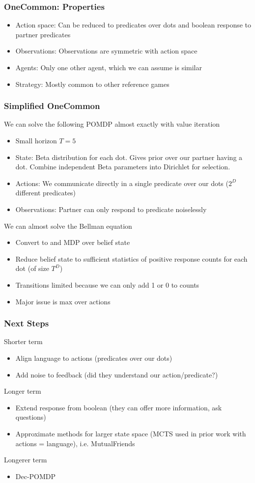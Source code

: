 \documentclass{beamer}
\begin{document}
\begin{frame}
\frametitle{OneCommon: Properties}
\begin{itemize}
\item Action space: Can be reduced to predicates over dots and boolean response
    to partner predicates
\item Observations: Observations are symmetric with action space
\item Agents: Only one other agent, which we can assume is similar
\item Strategy: Mostly common to other reference games
\end{itemize}
\end{frame}

\begin{frame}
\frametitle{Simplified OneCommon}
We can solve the following POMDP almost exactly with value iteration
\begin{itemize}
\item Small horizon $T=5$
\item State: Beta distribution for each dot.
    Gives prior over our partner having a dot.
    Combine independent Beta parameters into Dirichlet for selection.
\item Actions: We communicate directly in a single predicate over our dots
    ($2^{D}$ different predicates)
\item Observations: Partner can only respond to predicate noiselessly
\end{itemize}
We can almost solve the Bellman equation
\begin{itemize}
\item Convert to and MDP over belief state
\item Reduce belief state to sufficient statistics of positive response counts for each dot
    (of size $T^D$)
\item Transitions limited because we can only add 1 or 0 to counts
\item Major issue is max over actions
\end{itemize}
\end{frame}

\begin{frame}
\frametitle{Next Steps}
Shorter term
\begin{itemize}
\item Align language to actions (predicates over our dots)
\item Add noise to feedback (did they understand our action/predicate?)
\end{itemize}
Longer term
\begin{itemize}
\item Extend response from boolean (they can offer more information, ask questions)
\item Approximate methods for larger state space (MCTS used in prior work with actions = language),
    i.e. MutualFriends
\end{itemize}
Longerer term
\begin{itemize}
\item Dec-POMDP
\end{itemize}
\end{frame}
\end{document}
